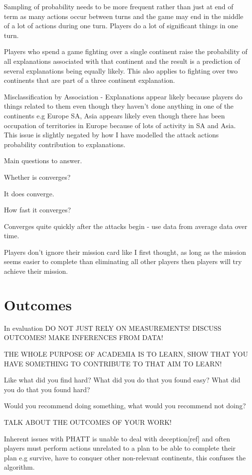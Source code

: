 \documentclass[parskip]{cs4rep}
\begin{document}
Sampling of probability needs to be more frequent rather than just at end of term as many actions occur between turns and the game may end in the middle of a lot of actions during one turn. Players do a lot of significant things in one turn.

Players who spend a game fighting over a single continent raise the probability of all explanations associated with that continent and the result is a prediction of several explanations being equally likely. This also applies to fighting over two continents that are part of a three continent explanation.

Misclassification by Association - Explanations appear likely because players do things related to them even though they haven't done anything in one of the continents e.g Europe SA, Asia appears likely even though there has been occupation of territories in Europe because of lots of activity in SA and Asia. This issue is slightly negated by how I have modelled the attack actions probability contribution to explanations.

Main questions to answer.

Whether is converges?

It does converge.

How fast it converges?

Converges quite quickly after the attacks begin - use data from average data over time.

Players don't ignore their mission card like I first thought, as long as the mission seems easier to complete than eliminating all other players then players will try achieve their mission.

\section{Outcomes}

In evaluation DO NOT JUST RELY ON MEASUREMENTS! DISCUSS OUTCOMES! MAKE INFERENCES FROM DATA!

THE WHOLE PURPOSE OF ACADEMIA IS TO LEARN, SHOW THAT YOU HAVE SOMETHING TO CONTRIBUTE TO THAT AIM TO LEARN!

Like what did you find hard? What did you do that you found easy? What did you do that you found hard? 

Would you recommend doing something, what would you recommend not doing?

TALK ABOUT THE OUTCOMES OF YOUR WORK!

Inherent issues with PHATT is unable to deal with deception[ref] and often players must perform actions unrelated to a plan to be able to complete their plan e.g survive, have to conquer other non-relevant continents, this confuses the algorithm.
\end{document}

